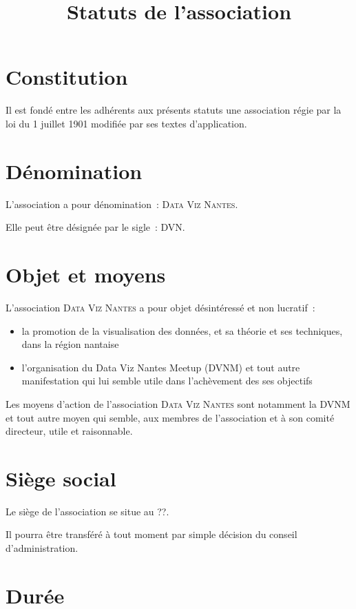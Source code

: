 \documentclass[12 pt]{article}
\title{Statuts de l'association \\
  \Nom}
\date{}
\newcommand{\Nom}{\textsc{Data Viz Nantes}}
\newcommand{\Sigle}{DVN}
\begin{document}
\maketitle

\section{Constitution}
\label{sec:constitution}

Il est fondé entre les adhérents aux présents statuts une association
régie par la loi du 1\ier{} juillet 1901 modifiée par ses textes
d'application.

\section{Dénomination}
\label{sec:denomination}
L'association a pour dénomination~: \og\Nom\fg.

Elle peut être désignée par le sigle~: \og\Sigle\fg.

\section{Objet et moyens}
\label{sec:objet-et-moyens}

L'association \Nom{} a pour objet désintéressé et non lucratif~:

\begin{itemize}
\item la promotion de la visualisation des données, et sa théorie et
  ses techniques, dans la région nantaise
\item l'organisation du Data Viz Nantes Meetup (DVNM) et tout
  autre manifestation qui lui semble utile dans l'achèvement des ses objectifs
\end{itemize}

Les moyens d'action de l'association \Nom{} sont notamment la DVNM et
tout autre moyen qui semble, aux membres de l'association et à son
comité directeur, utile et raisonnable.

\section{Siège social}
\label{sec:siege-social}

Le siège de l'association se situe au ??.

Il pourra être transféré à tout moment par simple décision du conseil
d'administration.

\section{Durée}
\label{sec:duree}
\end{document}
